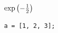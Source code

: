 \documentclass{article}
\begin{document}
$\exp\left(-\frac{1}{2}\right)$

\begin{lstlisting}[style=MatlabStyle]
a = [1, 2, 3];
\end{lstlisting}
\end{document}

